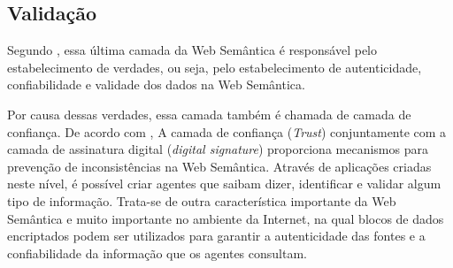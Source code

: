 \subsection{Validação}

Segundo \cite{santarem}, essa última camada da Web Semântica é responsável pelo estabelecimento de verdades, ou seja, pelo estabelecimento de autenticidade, confiabilidade e validade dos dados na Web Semântica.

Por causa dessas verdades, essa camada também é chamada de camada de confiança. De acordo com \cite{rosa}, A camada de confiança (\emph{Trust}) conjuntamente com a camada de assinatura digital (\emph{digital signature}) proporciona mecanismos para prevenção de inconsistências na Web Semântica. Através de aplicações criadas neste nível, é possível criar agentes que saibam dizer, identificar e validar algum tipo de informação. Trata-se de outra característica importante da Web Semântica e muito importante no ambiente da Internet, na qual blocos de dados encriptados podem ser utilizados para garantir a autenticidade das fontes e a confiabilidade da informação que os agentes consultam. 




